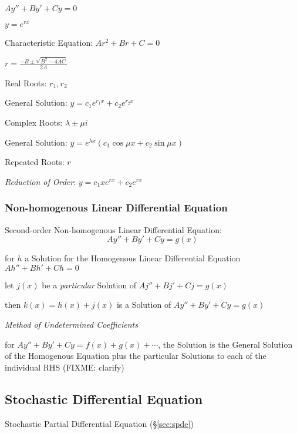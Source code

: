 $A y'' + B y' + C y = 0$

$y = e^{rx}$

Characteristic Equation: $Ar^2 + Br + C = 0$

$r = \frac{-B \pm \sqrt{B^2 - 4AC}}{2A}$

Real Roots: $r_1, r_2$

General Solution: $y = c_1e^{r_1x} + c_2e^{r_2x}$

Complex Roots: $\lambda \pm \mu i$

General Solution: $y = e^{\lambda x}(c_1 \cos\mu{x} + c_2 \sin\mu{x})$

Repeated Roots: $r$

\emph{Reduction of Order}: $y = c_1 x e^{rx} + c_2 e^{rx}$



\subsubsection{Non-homogenous Linear Differential Equation}
\label{sec:nonhomogenous_linear_differential}

Second-order Non-homogenous Linear Differential Equation:
\[
  A y'' + B y' + C y = g(x)
\]

for $h$ a Solution for the Homogenous Linear Differential Equation $Ah'' + Bh'
+ Ch = 0$

let $j(x)$ be a \emph{particular} Solution of $Aj'' + Bj' + Cj = g(x)$

then $k(x) = h(x) + j(x)$ is a Solution of $A y'' + B y' + C y = g(x)$

\emph{Method of Undetermined Coefficients}

for $A y'' + B y' + C y = f(x) + g(x) + \cdots$, the Solution is the General
Solution of the Homogenous Equation plus the particular Solutions to each of
the individual RHS (FIXME: clarify)



\subsection{Stochastic Differential Equation}\label{sec:sde}

\fist Stochastic Partial Differential Equation (\S\ref{sec:spde})



